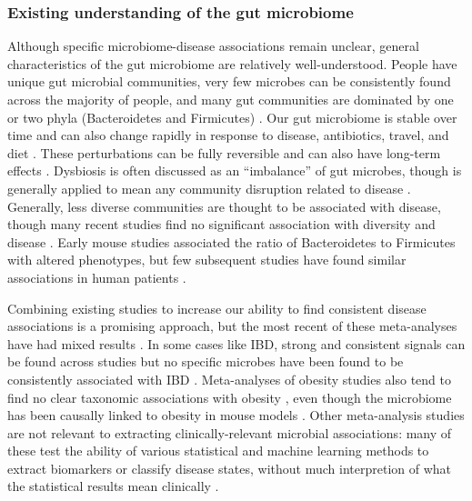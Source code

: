 \documentclass[12pt]{article}
\begin{document}
\subsubsection{Existing understanding of the gut microbiome}

Although specific microbiome-disease associations remain unclear, general characteristics
of the gut microbiome are relatively well-understood. People have unique gut microbial 
communities, very few microbes can be consistently found across the majority of people,
and many gut communities are dominated by one or two phyla (Bacteroidetes and Firmicutes) \cite{hmp-2012}.
Our gut microbiome is stable over time and can also change rapidly in response to 
disease, antibiotics, travel, and diet \cite{david-huge-2012}. These perturbations can be fully reversible
and can also have long-term effects \cite{david-huge-2012}.
Dysbiosis is often discussed as an ``imbalance'' of gut microbes, though
is generally applied to mean any community disruption related to disease \cite{costello-ecology-2012}.
Generally, less diverse communities are thought to be associated with disease,
though many recent studies find no significant association with diversity and disease \cite{walters-ob_meta-2014}.
Early mouse studies associated the ratio of Bacteroidetes to Firmicutes with
altered phenotypes, but few subsequent studies have found similar associations
in human patients \cite{turnbaugh-energy_harvest-2006, sze-signal-2016}. 

Combining existing studies to increase our ability to find consistent
disease associations is a promising approach, but the most recent of these meta-analyses
have had mixed results \cite{walters-ob_meta-2014, sze-signal-2016}. 
In some cases like IBD, strong and consistent 
signals can be found across studies but no specific microbes have 
been found to be consistently associated with IBD \cite{walters-ob_meta-2014}. Meta-analyses of obesity studies also tend 
to find no clear taxonomic associations with obesity \cite{sze-signal-2016, walters-ob_meta-2014},
even though the microbiome has been causally linked to obesity in mouse models \cite{turnbaugh-energy_harvest-2006, ridaura-mouse_fmt-2013}. 
Other meta-analysis studies are not relevant to extracting 
clinically-relevant microbial associations: many of these test the 
ability of various statistical and machine learning methods
to extract biomarkers or classify disease states, without much
interpretion of what the statistical results mean clinically
\cite{knights-supervised-2010, lozupone-meta-2013, knights-biomarkers-2011, pasolli-meta_analysis-2016}.
\end{document}
